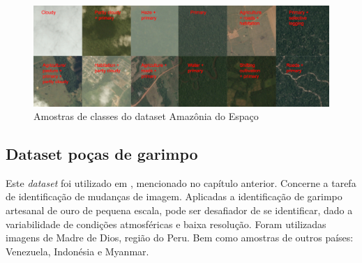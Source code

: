 \begin{figure}[!ht]
    \centering
    \includegraphics[width=0.9\columnwidth]{
        Imagens/chips.jpg
    }
    \caption{Amostras de classes do dataset Amazônia do Espaço}\label{fig:dataset}
\end{figure}



\subsection{Dataset poças de garimpo}\label{sec:Cap2_amazonia_garimpo}

Este \textit{dataset} foi utilizado em \cite{rs14071746}, mencionado no capítulo anterior. Concerne a tarefa de identificação de mudanças de imagem. Aplicadas a identificação de garimpo artesanal de ouro de pequena escala, pode ser desafiador de se identificar, dado a variabilidade de condições atmosféricas e baixa resolução. Foram utilizadas imagens de Madre de Dios, região do Peru. Bem como amostras de outros países: Venezuela, Indonésia e Myanmar. 

